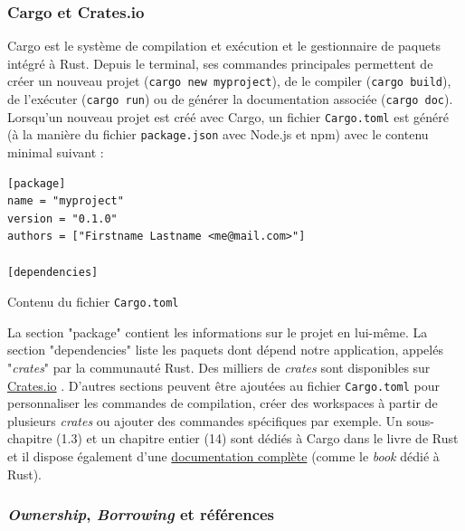 \documentclass[a4paper, 12pt]{article}
\newenvironment{code}{\captionsetup{type=listing}}{}
\begin{document}
\subsubsection{Cargo et Crates.io}\label{cargo_crates}
Cargo est le système de compilation et exécution et le gestionnaire de paquets intégré à Rust.
Depuis le terminal, ses commandes principales permettent de créer un nouveau projet 
(\texttt{cargo new myproject}), de le compiler (\texttt{cargo build}), de 
l'exécuter (\texttt{cargo run}) ou de générer la documentation associée 
(\texttt{cargo doc}). Lorsqu'un nouveau projet est créé avec Cargo, un fichier 
\texttt{Cargo.toml} est généré (à la manière du fichier \texttt{package.json} 
avec Node.js et npm) avec le contenu minimal suivant :
\bigbreak
\begin{code}
    \begin{verbatim}
[package]
name = "myproject"
version = "0.1.0"
authors = ["Firstname Lastname <me@mail.com>"]

[dependencies]
    \end{verbatim}
    \caption{Contenu du fichier \texttt{Cargo.toml}}
\end{code}
\bigbreak
La section "package" contient les informations sur le projet en lui-même. La section "dependencies" 
liste les paquets dont dépend notre application, appelés "\textit{crates}" par la communauté Rust. 
Des milliers de \textit{crates} sont disponibles sur \href{https://crates.io}{Crates.io} \cite{ref33}. 
D'autres sections peuvent être ajoutées au fichier \texttt{Cargo.toml} pour personnaliser 
les commandes de compilation, créer des workspaces à partir de plusieurs \textit{crates} ou ajouter 
des commandes spécifiques par exemple.
Un sous-chapitre (1.3) et un chapitre entier (14) sont dédiés à Cargo dans le livre de Rust \cite{ref0} 
et il dispose également d'une \href{https://doc.rust-lang.org/cargo/}{documentation complète} 
\cite{ref35} (comme le \textit{book} dédié à Rust).

\subsubsection{\textit{Ownership}, \textit{Borrowing} et références}\label{rust_ownership_borrowing}
\end{document}
